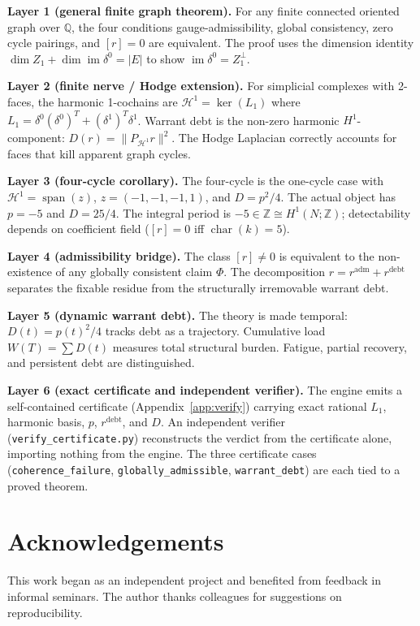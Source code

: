 \documentclass[11pt]{article}
\begin{document}
\textbf{Layer 1 (general finite graph theorem).}
For any finite connected oriented graph over $\mathbb{Q}$, the four conditions
gauge-admissibility, global consistency, zero cycle pairings, and $[r]=0$ are
equivalent. The proof uses the dimension identity
$\dim Z_1 + \dim\operatorname{im}\delta^0 = |E|$
to show $\operatorname{im}\delta^0 = Z_1^\perp$.

\textbf{Layer 2 (finite nerve / Hodge extension).}
For simplicial complexes with 2-faces, the harmonic 1-cochains are
$\mathcal{H}^1 = \ker(L_1)$ where $L_1 = \delta^0(\delta^0)^T + (\delta^1)^T\delta^1$.
Warrant debt is the non-zero harmonic $H^1$-component:
$D(r)=\|P_{\mathcal{H}^1}r\|^2$.
The Hodge Laplacian correctly accounts for faces that kill apparent graph cycles.

\textbf{Layer 3 (four-cycle corollary).}
The four-cycle is the one-cycle case with $\mathcal{H}^1=\operatorname{span}(z)$,
$z=(-1,-1,-1,1)$, and $D=p^2/4$.
The actual object has $p=-5$ and $D=25/4$.
The integral period is $-5\in\mathbb{Z}\cong H^1(N;\mathbb{Z})$;
detectability depends on coefficient field ($[r]=0$ iff $\operatorname{char}(k)=5$).

\textbf{Layer 4 (admissibility bridge).}
The class $[r]\neq0$ is equivalent to the non-existence of any globally
consistent claim $\Phi$.
The decomposition $r=r^{\mathrm{adm}}+r^{\mathrm{debt}}$ separates the
fixable residue from the structurally irremovable warrant debt.

\textbf{Layer 5 (dynamic warrant debt).}
The theory is made temporal: $D(t)=p(t)^2/4$ tracks debt as a trajectory.
Cumulative load $W(T)=\sum D(t)$ measures total structural burden.
Fatigue, partial recovery, and persistent debt are distinguished.

\textbf{Layer 6 (exact certificate and independent verifier).}
The engine emits a self-contained certificate (Appendix~\ref{app:verify})
carrying exact rational $L_1$, harmonic basis, $p$, $r^{\mathrm{debt}}$, and $D$.
An independent verifier (\texttt{verify\_certificate.py}) reconstructs the verdict
from the certificate alone, importing nothing from the engine.
The three certificate cases (\texttt{coherence\_failure},
\texttt{globally\_admissible}, \texttt{warrant\_debt})
are each tied to a proved theorem.

\section*{Acknowledgements}
This work began as an independent project and benefited from feedback in
informal seminars. The author thanks colleagues for suggestions on
reproducibility.
\end{document}

